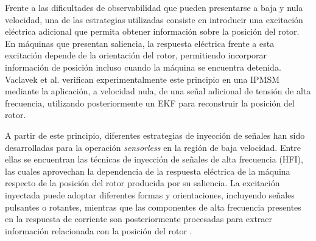 Frente a las dificultades de observabilidad que pueden presentarse a baja y nula velocidad, una de las estrategias utilizadas consiste en introducir una excitación eléctrica adicional que permita obtener información sobre la posición del rotor. En máquinas que presentan saliencia, la respuesta eléctrica frente a esta excitación depende de la orientación del rotor, permitiendo incorporar información de posición incluso cuando la máquina se encuentra detenida. Vaclavek et al. \cite{vaclavekACDriveObservability2013} verifican experimentalmente este principio en una IPMSM mediante la aplicación, a velocidad nula, de una señal adicional de tensión de alta frecuencia, utilizando posteriormente un EKF para reconstruir la posición del rotor.

A partir de este principio, diferentes estrategias de inyección de señales han sido desarrolladas para la operación \textit{sensorless} en la región de baja velocidad. Entre ellas se encuentran las técnicas de inyección de señales de alta frecuencia (HFI), las cuales aprovechan la dependencia de la respuesta eléctrica de la máquina respecto de la posición del rotor producida por su saliencia. La excitación inyectada puede adoptar diferentes formas y orientaciones, incluyendo señales pulsantes o rotantes, mientras que las componentes de alta frecuencia presentes en la respuesta de corriente son posteriormente procesadas para extraer información relacionada con la posición del rotor \cite{wangPositionSensorlessPermanent2020}.

